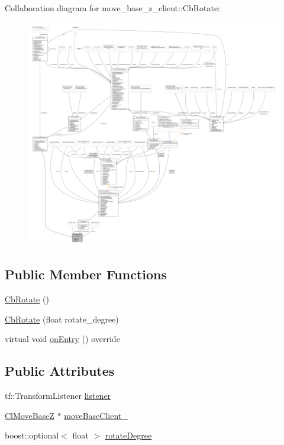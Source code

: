Collaboration diagram for move\+\_\+base\+\_\+z\+\_\+client\+:\+:Cb\+Rotate\+:
\nopagebreak
\begin{figure}[H]
\begin{center}
\leavevmode
\includegraphics[width=350pt]{classmove__base__z__client_1_1CbRotate__coll__graph}
\end{center}
\end{figure}
\subsection*{Public Member Functions}
\begin{DoxyCompactItemize}
\item 
\hyperlink{classmove__base__z__client_1_1CbRotate_a38365918a9749d2ad85b584a2ab0a102}{Cb\+Rotate} ()
\item 
\hyperlink{classmove__base__z__client_1_1CbRotate_aca51890e44db143f216d9951ab2afaf3}{Cb\+Rotate} (float rotate\+\_\+degree)
\item 
virtual void \hyperlink{classmove__base__z__client_1_1CbRotate_a1528192ce89f2c1cbd9deffafecefb69}{on\+Entry} () override
\end{DoxyCompactItemize}
\subsection*{Public Attributes}
\begin{DoxyCompactItemize}
\item 
tf\+::\+Transform\+Listener \hyperlink{classmove__base__z__client_1_1CbRotate_ad9afe4d39997d7b44fc304f81f519cc5}{listener}
\item 
\hyperlink{classmove__base__z__client_1_1ClMoveBaseZ}{Cl\+Move\+BaseZ} $\ast$ \hyperlink{classmove__base__z__client_1_1CbRotate_a292c3739c4c1e668c0c6e241127b5c50}{move\+Base\+Client\+\_\+}
\item 
boost\+::optional$<$ float $>$ \hyperlink{classmove__base__z__client_1_1CbRotate_a30d0f24b857149d78a023635562516b6}{rotate\+Degree}
\end{DoxyCompactItemize}


